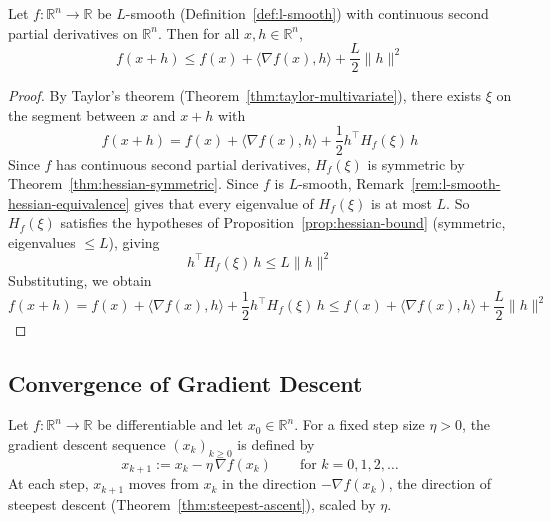 		\begin{lemma}
			\label{lem:descent}
			Let $f:\mathbb{R}^n\to\mathbb{R}$ be $L$-smooth (Definition~\ref{def:l-smooth}) with continuous second partial derivatives on $\mathbb{R}^n$. Then for all $x,h\in\mathbb{R}^n$,
			\[
				f(x+h) \le f(x) + \langle \nabla f(x), h \rangle + \frac{L}{2}\|h\|^2
			\]
		\end{lemma}
		
		\begin{proof}
			By Taylor's theorem (Theorem~\ref{thm:taylor-multivariate}), there exists $\xi$ on the segment between $x$ and $x+h$ with
			\[
				f(x+h) = f(x) + \langle \nabla f(x), h \rangle + \frac{1}{2} h^\top H_f(\xi)\, h
			\]
			Since $f$ has continuous second partial derivatives, $H_f(\xi)$ is symmetric by Theorem~\ref{thm:hessian-symmetric}. Since $f$ is $L$-smooth, Remark~\ref{rem:l-smooth-hessian-equivalence} gives that every eigenvalue of $H_f(\xi)$ is at most $L$. So $H_f(\xi)$ satisfies the hypotheses of Proposition~\ref{prop:hessian-bound} (symmetric, eigenvalues $\le L$), giving
			\[
				h^\top H_f(\xi)\, h \le L\|h\|^2
			\]
			Substituting, we obtain
			\[
				f(x+h) = f(x) + \langle \nabla f(x), h \rangle + \frac{1}{2} h^\top H_f(\xi)\, h \le f(x) + \langle \nabla f(x), h \rangle + \frac{L}{2}\|h\|^2
			\]
		\end{proof}
		
	\subsection{Convergence of Gradient Descent}
		
		\begin{definition}
			\label{def:gradient-descent}
			Let $f:\mathbb{R}^n\to\mathbb{R}$ be differentiable and let $x_0\in\mathbb{R}^n$. For a fixed step size $\eta>0$, the gradient descent sequence $(x_k)_{k\ge0}$ is defined by
			\[
				x_{k+1} := x_k - \eta\, \nabla f(x_k) \qquad \text{for } k=0,1,2,\dots
			\]
			At each step, $x_{k+1}$ moves from $x_k$ in the direction $-\nabla f(x_k)$, the direction of steepest descent (Theorem~\ref{thm:steepest-ascent}), scaled by $\eta$.
		\end{definition}
		

